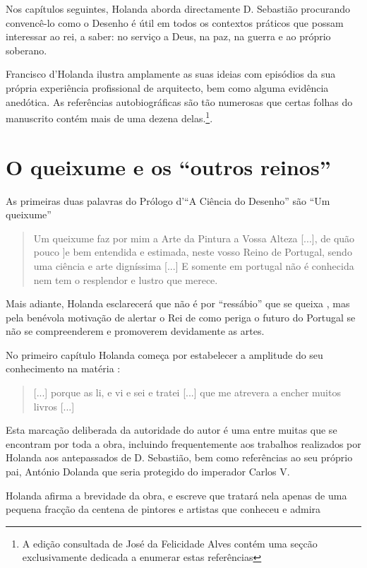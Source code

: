 \documentclass{article}
\begin{document}
Nos capítulos seguintes, Holanda aborda directamente D. Sebastião
procurando convencê-lo como o Desenho é útil em todos os contextos
práticos que possam interessar ao rei, a saber: no serviço a Deus, na
paz, na guerra e ao próprio soberano.

Francisco d'Holanda ilustra amplamente as suas ideias com episódios da
sua própria experiência profissional de arquitecto, bem como alguma
evidência anedótica. As referências autobiográficas são tão numerosas
que certas folhas do manuscrito contém mais de uma dezena
delas.\footnote{A edição consultada de José da Felicidade Alves contém
  uma seçcão exclusivamente dedicada a enumerar estas referências}.

\section{O queixume e os ``outros reinos''}

As primeiras duas palavras do Prólogo d'``A Ciência do Desenho'' são
``Um queixume'' \cite[fl.34r]{holanda}

\begin{quote}
  Um queixume faz por mim a Arte da Pintura a Vossa Alteza [...], de
  quão pouco ]e bem entendida e estimada, neste vosso Reino de
    Portugal, sendo uma ciência e arte digníssima [...] E somente em
    portugal não é conhecida nem tem o resplendor e lustro que merece.
\end{quote}

Mais adiante, Holanda esclarecerá que não é por ``ressábio'' que se
queixa \cite[fl.36v]{holanda}, mas pela benévola motivação de alertar
o Rei de como periga o futuro do Portugal se não se compreenderem e
promoverem devidamente as artes.

No primeiro capítulo Holanda começa por estabelecer a amplitude do seu
conhecimento na matéria \cite[fl.34r]{holanda}:

\begin{quote}
  [...] porque as li, e vi e sei e tratei [...] que me atrevera a
  encher muitos livros [...]
\end{quote}

Esta marcação deliberada da autoridade do autor é uma entre muitas que
se encontram por toda a obra, incluindo frequentemente aos trabalhos
realizados por Holanda aos antepassados de D. Sebastião, bem como
referências ao seu próprio pai, António Dolanda que seria protegido do
imperador Carlos V.

Holanda afirma a brevidade da obra, e escreve que tratará nela apenas
de uma pequena fracção da centena de pintores e artistas que conheceu
e admira \cite[fl.34r]{holanda}
\end{document}
